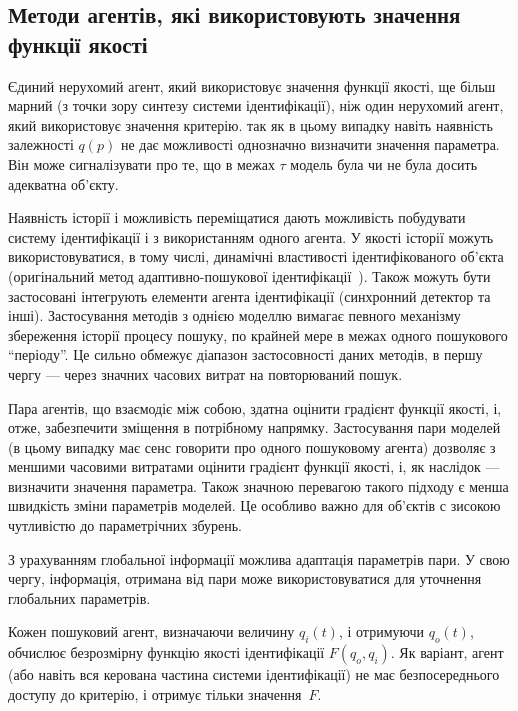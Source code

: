 
\subsection{Методи агентів, які використовують значення функції якості}%

Єдиний нерухомий агент, який використовує значення функції якості, ще більш марний
(з точки зору синтезу системи ідентифікації), ніж один нерухомий агент, який
використовує значення критерію.
%
так як в цьому випадку навіть наявність залежності
$q(p)$ не дає можливості однозначно визначити значення
параметра. Він може сигналізувати про те, що в межах \(\tau \) модель
була чи не була досить адекватна об'єкту.

Наявність історії і можливість переміщатися дають можливість
побудувати систему ідентифікації і з використанням одного агента.
У якості історії
можуть використовуватися, в тому числі, динамічні властивості
ідентифікованого об'єкта
(оригінальний метод адаптивно-пошукової ідентифікації~\cite{mich_92,mich_92}).
Також можуть бути застосовані інтегрують елементи агента
ідентифікації (синхронний детектор та інші).
Застосування методів з однією моделлю вимагає певного механізму
збереження історії процесу пошуку, по крайней мере в межах
одного пошукового ``періоду''. Це сильно обмежує діапазон
застосовності даних методів, в першу чергу --- через значних
часових витрат на повторюваний пошук.

Пара агентів, що взаємодіє між собою, здатна оцінити градієнт функції якості,
і, отже, забезпечити зміщення в потрібному напрямку.
Застосування пари моделей \cite{atu_asau3} (в цьому випадку має сенс
говорити про одного пошуковому агента) дозволяє з меншими
часовими витратами оцінити градієнт функції якості, і,
як наслідок --- визначити значення параметра. Також значною
перевагою такого підходу є менша швидкість зміни параметрів
моделей. Це особливо важно для об'єктів с зисокою чутливістю
до параметрічних збурень.

З урахуванням глобальної інформації можлива адаптація
параметрів пари. У свою чергу, інформація, отримана від пари
може використовуватися для уточнення глобальних параметрів.

Кожен пошуковий агент, визначаючи величину $q_{i}(t)$, і отримуючи $q_o(t)$,
обчислює безрозмірну функцію якості ідентифікації $F (q_o, q_i)$. Як
варіант, агент (або навіть вся керована частина системи ідентифікації) не має
безпосереднього доступу до критерію, і отримує тільки значення~$F$.

